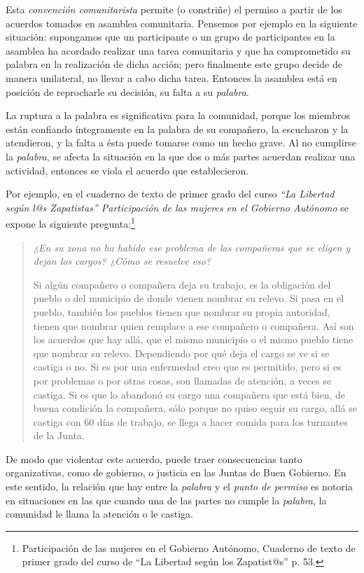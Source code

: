 \documentclass[oneside]{book}
\begin{document}
Esta \textit{convención comunitarista} permite (o constriñe) el permiso a partir de los acuerdos tomados en asamblea comunitaria. Pensemos por ejemplo en la siguiente situación: supongamos que un participante o un grupo de participantes en la asamblea ha acordado realizar una tarea comunitaria y que ha comprometido su palabra en la realización de dicha acción; pero finalmente este grupo decide de manera unilateral, no llevar a cabo dicha tarea. Entonces la asamblea está en posición de reprocharle su decisión, su falta a su \textit{palabra}.

La ruptura a la palabra es significativa para la comunidad, porque los miembros están confiando íntegramente en la palabra de su compañero, la escucharon y la atendieron, y la falta a ésta puede tomarse como un hecho grave. Al no cumplirse la \textit{palabra}, se afecta la situación en la que dos o más partes acuerdan realizar una actividad, entonces se viola el acuerdo que establecieron.

Por ejemplo, en el cuaderno de texto de primer grado del curso \textit{“La Libertad según l@s Zapatistas” Participación de las mujeres en el Gobierno Autónomo} se expone la siguiente pregunta:\footnote{Participación de las mujeres en el Gobierno Autónomo, Cuaderno de texto de primer grado del curso de “La Libertad según los Zapatist@s” p. 53.}
\begin{quote}

	\textit{¿En su zona no ha habido ese problema de las compañeras que se eligen y dejan los cargos? ¿Cómo se resuelve eso?}

Si algún compañero o compañera deja su trabajo, es la obligación del pueblo o del municipio de donde vienen nombrar su relevo. Si pasa en el pueblo, también los pueblos tienen que nombrar su propia autoridad, tienen que nombrar quien remplace a ese compañero o compañera. Así son los acuerdos que hay allá, que el mismo municipio o el mismo pueblo tiene que nombrar su relevo. Dependiendo por qué deja el cargo se ve si se castiga o no. Si es por una enfermedad creo que es permitido, pero si es por problemas o por otras cosas, son llamadas de atención, a veces se castiga. Si es que lo abandonó su cargo una compañera que está bien, de buena condición la compañera, sólo porque no quiso seguir su cargo, allá se castiga con 60 días de trabajo, se llega a hacer comida para los turnantes de la Junta.
\end{quote}

De modo que violentar este acuerdo, puede traer consecuencias tanto organizativas, como de gobierno, o justicia en las Juntas de Buen Gobierno. En este sentido, la relación que hay entre la \textit{palabra} y el \textit{punto de permiso} es notoria en situaciones en las que cuando una de las partes no cumple la \textit{palabra}, la comunidad le llama la atención o le castiga.
\end{document}
